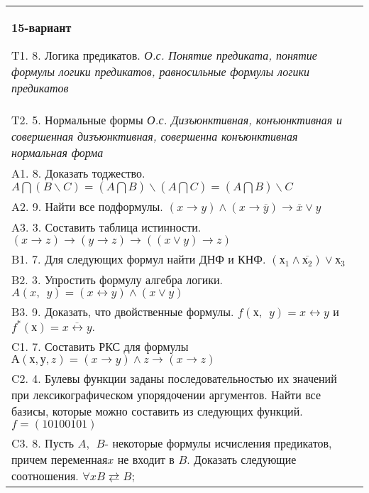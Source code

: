 \documentclass{article}
\begin{document}
\begin{tabular}{m{17cm}}
\textbf{15-вариант}
\newline

T1. 8. Логика предикатов. \emph{О.с. Понятие предиката, понятие формулы логики предикатов, равносильные формулы логики предикатов} \\
T2. 5. Нормальные формы \emph{О.с. Дизъюнктивная, конъюнктивная и совершенная дизъюнктивная, совершенна конъюнктивная нормальная форма} \\
A1. 8. Доказать тоджество. \(A\bigcap(B\backslash C) = (A\bigcap B)\backslash(A\bigcap C) = (A\bigcap B)\backslash C\) \\
A2. 9. Найти все подформулы. \((x \rightarrow y) \land (x \rightarrow \overline{y}) \rightarrow \overline{x} \vee y\) \\
A3. 3. Составить таблица истинности. \((x \rightarrow z) \rightarrow (y \rightarrow z) \rightarrow ((x \vee y) \rightarrow z)\) \\
B1. 7. Для следующих формул найти ДНФ и КНФ. \(\left( х_{1} \land \overline{х_{2}} \right) \vee х_{3}\) \\
B2. 3. Упростить формулу алгебра логики. \(A(x,\ \ y) = (x \leftrightarrow y) \land (x \vee y)\) \\
B3. 9. Доказать, что двойственные формулы. \(f(х,\ \ y) = x \leftrightarrow y\) и \(f^{*}(х) = \overline{x \leftrightarrow y}.\) \\
C1. 7. Составить РКС для формулы \(А(х,у,z) = (x \rightarrow y) \land z \rightarrow (x \rightarrow z)\) \\
C2. 4. Булевы функции заданы последовательностью их значений при лексикографическом упорядочении аргументов. Найти все базисы, которые можно составить из следующих функций. \(f = (10100101)\) \\
C3. 8. Пусть \(A,\ \ B\)- некоторые формулы исчисления предикатов, причем переменная\(x\) не входит в \(B\). Доказать следующие соотношения. \(\forall xB \rightleftarrows B\); \\

\end{tabular}
\vspace{1cm}
\end{document}
